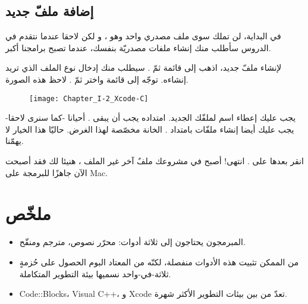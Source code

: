 \subsection{إضافة ملفّ جديد}

في البداية، لن تملك سوى ملف مصدري واحد وهو
،
و لكن لاحقا عندما نتقدم في الدروس سأطلب منك إنشاء ملفات مصدريّة بنفسك، عندما تصبح برامجنا أكبر.

لإنشاء ملفّ جديد، اذهب إلى قائمة
ثمّ
.
سيطلب منك إدخال نوع الملف الذي تريد إنشاءه. توجّه إلى قائمة
واختر
ثمّ
.
لاحظ هذه الصورة.

\begin{figure}[H]
	\centering
	\texttt{[image: Chapter\_I-2\_Xcode-C]}
\end{figure}

يجب عليك إعطاء اسم لملفّك الجديد. امتداده يجب أن يبقى
.
أحيانا -كما سنرى لاحقا- يجب عليك أيضا إنشاء ملفّات بامتداد
.
الخانة
مخصّصة لهذا الغرض. حاليّا هذا الخيار لا يهمّنا.

انقر بعدها على
.
انتهى! أصبح في مشروعك ملفٌ آخر غير الملف
،
هنيئا لك فقد أصبحت الآن جاهزًا للبرمجة على \textenglish{Mac}.

\section*{ملخّص}

\begin{itemize}
  \item المبرمجون يحتاجون إلى ثلاثة أدوات: محرّر نصوص، مترجم ومنقّح.
  \item من الممكن تثبيت هذه الأدوات منفصلة، لكنّه من المعتاد البوم الحصول على حُزمةٍ ثلاثة-في-واحد نسميها بيئة التطوير المتكاملة.
  \item \textenglish{Code::Blocks}،
\textenglish{Visual C++}،
و
\textenglish{Xcode}
تعدّ من بين بيئات التطوير الأكثر شهرة.
\end{itemize}
